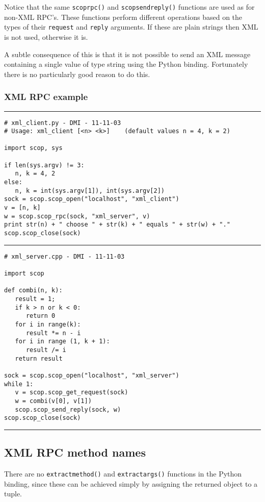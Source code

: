 \documentclass[12pt,a4paper,twoside]{article}
\renewcommand{\_}{\texttt{\symbol{95}}}
\newcommand{\codebar}{\rule{\textwidth}{0.3mm}}
\begin{document}
Notice that the same \texttt{scop\_rpc()} and
\texttt{scop\_send\_reply()} functions are used as for
non-XML RPC's. These functions perform different operations based on the types
of their \texttt{request} and \texttt{reply} arguments. If these are
plain strings then XML is not used, otherwise it is.

A subtle consequence of this is
that it is not possible to send an XML message containing a single
value of type string using the Python binding. Fortunately there is no
particularly good reason to do this.

\subsubsection*{XML RPC example}

\codebar
\small
\begin{verbatim}
# xml_client.py - DMI - 11-11-03
# Usage: xml_client [<n> <k>]    (default values n = 4, k = 2)

import scop, sys

if len(sys.argv) != 3:
   n, k = 4, 2
else:
   n, k = int(sys.argv[1]), int(sys.argv[2])
sock = scop.scop_open("localhost", "xml_client")
v = [n, k]
w = scop.scop_rpc(sock, "xml_server", v)
print str(n) + " choose " + str(k) + " equals " + str(w) + "."
scop.scop_close(sock)
\end{verbatim}
\normalsize
\codebar
\small
\begin{verbatim}
# xml_server.cpp - DMI - 11-11-03

import scop

def combi(n, k):
   result = 1;
   if k > n or k < 0:
      return 0 
   for i in range(k):
      result *= n - i
   for i in range (1, k + 1):
      result /= i
   return result

sock = scop.scop_open("localhost", "xml_server")
while 1:
   v = scop.scop_get_request(sock)
   w = combi(v[0], v[1])
   scop.scop_send_reply(sock, w)
scop.scop_close(sock)
\end{verbatim}
\normalsize
\codebar

\subsection{XML RPC method names}

There are no \texttt{extract\_method()} and \texttt{extract\_args()}
functions in the Python binding, since these can be achieved
simply by assigning the returned object to a tuple.
\end{document}
